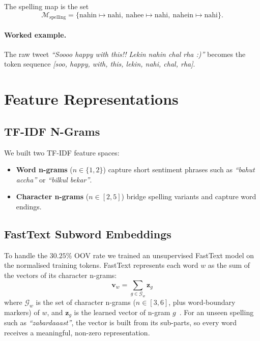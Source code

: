 \documentclass[11pt,a4paper]{article}
\begin{document}
The spelling map is the set
\begin{equation}
    \mathcal{M}_{\text{spelling}} = \{\text{nahin} \mapsto \text{nahi},\ \text{nahee} \mapsto \text{nahi},\ \text{nahein} \mapsto \text{nahi}\}.
\end{equation}

\paragraph{Worked example.}
The raw tweet \textit{``Soooo happy with this!! Lekin nahin chal rha :)''} becomes the token sequence
\textit{[soo, happy, with, this, lekin, nahi, chal, rha]}.

\section{Feature Representations}\label{sec:features}

\subsection{TF-IDF N-Grams}
We built two TF-IDF feature spaces:
\begin{itemize}
    \item \textbf{Word n-grams} ($n\in\{1,2\}$) capture short sentiment phrases such as \textit{``bahut accha''} or \textit{``bilkul bekar''}.
    \item \textbf{Character n-grams} ($n\in[2,5]$) bridge spelling variants and capture word endings.
\end{itemize}

\subsection{FastText Subword Embeddings}
To handle the $30.25\%$ OOV rate we trained an unsupervised FastText model on the normalised training tokens. FastText represents each word $w$ as the sum of the vectors of its character n-grams:
\begin{equation}
    \mathbf{v}_w = \sum_{g \in \mathcal{G}_w} \mathbf{z}_g
\end{equation}
where $\mathcal{G}_w$ is the set of character n-grams ($n\in[3,6]$, plus word-boundary markers) of $w$, and $\mathbf{z}_g$ is the learned vector of n-gram $g$~\cite{bojanowski2017enriching}. For an unseen spelling such as \textit{``zabardaaast''}, the vector is built from its sub-parts, so every word receives a meaningful, non-zero representation.
\end{document}
